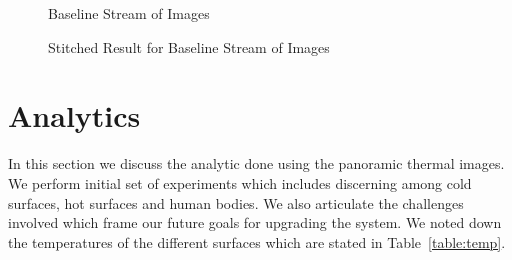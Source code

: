 \begin{figure*}[!htp]
\begin{minipage}{0.16\textwidth}
\begin{center}
 \end{center}
\end{minipage}
\begin{minipage}{0.16\textwidth}
\begin{center}
 \end{center}
\end{minipage}
\begin{minipage}{0.16\textwidth}
\begin{center}
 \end{center}
\end{minipage}
\begin{minipage}{0.16\textwidth}
\begin{center}
 \end{center}
\end{minipage}
\caption{Baseline Stream of Images}
\label{fig:Individual}
\end{figure*}



\begin{figure*}[!htp]
\begin{minipage}{0.01\textwidth}
\begin{center}
\end{center}
\end{minipage}
\begin{minipage}{1.2\textwidth}
\begin{center}
\end{center}
\end{minipage}
\caption{Stitched Result for Baseline Stream of Images}
\label{fig:Stitch}
\end{figure*}




 \section{Analytics}

    \indent In this section we discuss the analytic done using the panoramic thermal images. We perform initial set of experiments which includes discerning among cold surfaces, hot surfaces and human bodies. We also articulate the challenges involved which frame our future goals for upgrading the system. We noted down the temperatures of the different surfaces which are stated in Table~\ref{table:temp}.

